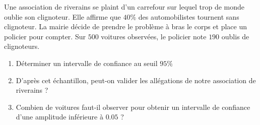 
\begin{exercice}\label{exosmath-0576}

    Une association de riverains se plaint d'un carrefour sur lequel trop de monde oublie son clignoteur. Elle affirme que \( 40\%\) des automobilistes tournent sans clignoteur. La mairie décide de prendre le problème à bras le corps et place un policier pour compter. Sur \( 500\) voitures observées, le policier note \( 190\) oublis de clignoteurs.
    \begin{enumerate}
        \item
            Déterminer un intervalle de confiance au seuil \( 95\%\)
        \item
            D'après cet échantillon, peut-on valider les allégations de notre association de riverains ?
        \item
            Combien de voitures faut-il observer pour obtenir un intervalle de confiance d'une amplitude inférieure à \( 0.05\) ?
    \end{enumerate}

\end{exercice}
